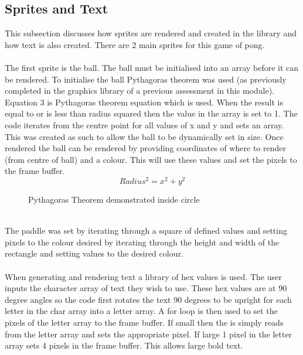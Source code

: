 \documentclass[a4paper,12pt]{article}
\begin{document}
\subsection{Sprites and Text}
\begin{flushleft}
This subsection discusses how sprites are rendered and created in the library and how text is also created. There are 2 main sprites for this game of pong.
\\ \- \\
The first sprite is the ball. The ball must be initialised into an array before it can be rendered. To initialise the ball Pythagoras theorem was used (as previously completed in the graphics library of a previous assessment in this module). Equation 3 is Pythagoras theorem equation which is used. When the result is equal to or is less than radius squared then the value in the array is set to 1. The code iterates from the centre point for all values of x and y and sets an array. This was created as such to allow the ball to be dynamically set in size. Once rendered the ball can be rendered by providing coordinates of where to render (from centre of ball) and a colour. This will use these values and set the pixels to the frame buffer.
\begin{equation}
	Radius^{2} = x^{2} + y^{2}
\end{equation}
\begin{figure}[H]
	\centering
	\caption{Pythagoras Theorem demonstrated inside circle}
\end{figure}
\- \\
The paddle was set by iterating through a square of defined values and setting pixels to the colour desired by iterating through the height and width of the rectangle and setting values to the desired colour.
\\ \- \\
When generating and rendering text a library of hex values is used. The user inputs the character array of text they wish to use. These hex values are at 90 degree angles so the code first rotates the text 90 degrees to be upright for each letter in the char array into a letter array. A for loop is then used to set the pixels of the letter array to the frame buffer. If small then the is simply reads from the letter array and sets the appropriate pixel. If large 1 pixel in the letter array sets 4 pixels in the frame buffer. This allows large bold text. 
\end{flushleft}
\newpage
\end{document}
